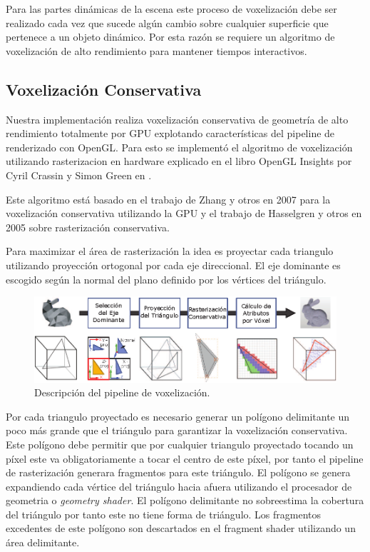 Para las partes dinámicas de la escena este proceso de voxelización debe ser realizado cada vez que sucede algún cambio sobre cualquier superficie que pertenece a un objeto dinámico. Por esta razón se requiere un algoritmo de voxelización de alto rendimiento para mantener tiempos interactivos.

\subsection{Voxelización Conservativa} %
\label{sub:voxelizacion_conservativa}
Nuestra implementación realiza voxelización conservativa de geometría de alto rendimiento totalmente por \ac{GPU} explotando características del pipeline de renderizado con OpenGL. Para esto se implementó el algoritmo de voxelización utilizando rasterizacion en hardware explicado en el libro OpenGL Insights por Cyril Crassin y Simon Green en  \cite{CozziRiccio12}. 

Este algoritmo está basado en el trabajo de Zhang y otros en 2007 \cite{zhang2007conservative} para la voxelización conservativa utilizando la \ac{GPU} y el trabajo de Hasselgren y otros en 2005 \cite{hasselgren2005conservative} sobre rasterización conservativa.

Para maximizar el área de rasterización la idea es proyectar cada triangulo utilizando proyección ortogonal por cada eje direccional. El eje dominante es escogido según la normal del plano definido por los vértices del triángulo.

\begin{figure}[H]
	\centering
	\captionsetup{justification=centering}
	\includegraphics[width=\linewidth]{media/voxelization_pipeline.eps}
	\caption{Descripción del pipeline de voxelización.}
\end{figure}
 
Por cada triangulo proyectado es necesario generar un polígono delimitante un poco más grande que el triángulo para garantizar la voxelización conservativa. Este polígono debe permitir que por cualquier triangulo proyectado tocando un píxel este va obligatoriamente a tocar el centro de este píxel, por tanto el pipeline de rasterización generara fragmentos para este triángulo. El polígono se genera expandiendo cada vértice del triángulo hacia afuera utilizando el procesador de geometria o \emph{geometry shader}. El polígono delimitante no sobreestima la cobertura del triángulo por tanto este no tiene forma de triángulo. Los fragmentos excedentes de este polígono son descartados en el fragment shader utilizando un  área delimitante.

